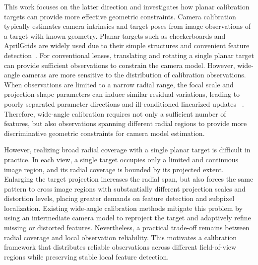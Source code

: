 \documentclass[letterpaper, 10 pt, conference]{ieeeconf}  %
\begin{document}
This work focuses on the latter direction and investigates how
planar calibration targets can provide more effective geometric
constraints. Camera calibration typically estimates camera intrinsics
and target poses from image observations of a target with known
geometry. Planar targets such as checkerboards and AprilGrids are
widely used due to their simple structures and convenient feature
detection~\cite{zhang2000flexible,olson2011apriltag}. For conventional lenses, translating and rotating a single
planar target can provide sufficient observations to constrain
the camera model. However, wide-angle cameras are more sensitive to
the distribution of calibration observations. When observations are
limited to a narrow radial range, the focal scale and projection-shape parameters can induce
similar residual variations, leading to poorly separated parameter
directions and ill-conditioned linearized updates
~\cite{liu2026observation}.
Therefore, wide-angle calibration requires not only a sufficient
number of features, but also observations spanning different radial
regions to provide more discriminative geometric constraints for
camera model estimation.

However, realizing broad radial coverage with a single planar target is
difficult in practice. In each view, a single target occupies only a
limited and continuous image region, and its radial coverage is bounded
by its projected extent. Enlarging the target projection increases the
radial span, but also forces the same pattern to cross image regions
with substantially different projection scales and distortion levels,
placing greater demands on feature detection and subpixel localization.
Existing wide-angle calibration methods mitigate this problem by using
an intermediate camera model to reproject the target and adaptively
refine missing or distorted features. Nevertheless, a practical trade-off
remains between radial coverage and local observation reliability. This
motivates a calibration framework that distributes reliable observations
across different field-of-view regions while preserving stable local
feature detection.
\end{document}

